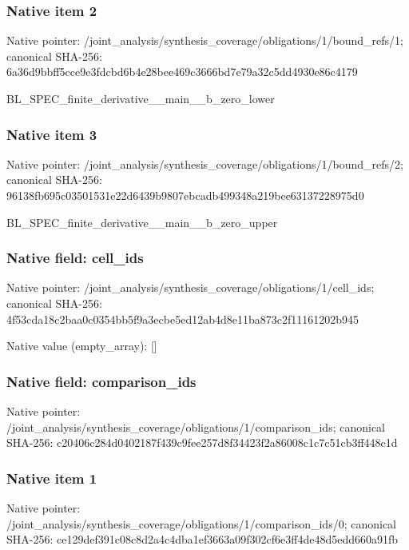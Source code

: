 \documentclass[10pt,a4paper]{article}
\begin{document}
\subsubsection{Native item 2}
Native pointer: /joint\_\allowbreak{}analysis/synthesis\_\allowbreak{}coverage/obligations/1/bound\_\allowbreak{}refs/1; canonical SHA-256: 6a36d9bbff5cce9e3fdcbd6b4e28bee469c3666bd7e79a32c5dd4930e86c4179

\begingroup\raggedright\sloppy BL\_\allowbreak{}SPEC\_\allowbreak{}finite\_\allowbreak{}derivative\_\allowbreak{}\_\allowbreak{}main\_\allowbreak{}\_\allowbreak{}b\_\allowbreak{}zero\_\allowbreak{}lower\par\endgroup

\subsubsection{Native item 3}
Native pointer: /joint\_\allowbreak{}analysis/synthesis\_\allowbreak{}coverage/obligations/1/bound\_\allowbreak{}refs/2; canonical SHA-256: 96138fb695c03501531e22d6439b9807ebcadb499348a219bee63137228975d0

\begingroup\raggedright\sloppy BL\_\allowbreak{}SPEC\_\allowbreak{}finite\_\allowbreak{}derivative\_\allowbreak{}\_\allowbreak{}main\_\allowbreak{}\_\allowbreak{}b\_\allowbreak{}zero\_\allowbreak{}upper\par\endgroup

\subsubsection{Native field: cell\_\allowbreak{}ids}
Native pointer: /joint\_\allowbreak{}analysis/synthesis\_\allowbreak{}coverage/obligations/1/cell\_\allowbreak{}ids; canonical SHA-256: 4f53cda18c2baa0c0354bb5f9a3ecbe5ed12ab4d8e11ba873c2f11161202b945

Native value (empty\_\allowbreak{}array): []

\subsubsection{Native field: comparison\_\allowbreak{}ids}
Native pointer: /joint\_\allowbreak{}analysis/synthesis\_\allowbreak{}coverage/obligations/1/comparison\_\allowbreak{}ids; canonical SHA-256: c20406c284d0402187f439c9fee257d8f34423f2a86008c1c7c51cb3ff448c1d

\subsubsection{Native item 1}
Native pointer: /joint\_\allowbreak{}analysis/synthesis\_\allowbreak{}coverage/obligations/1/comparison\_\allowbreak{}ids/0; canonical SHA-256: ce129def391c08c8d2a4c4dba1ef3663a09f302cf6e3ff4de48d5edd660a91fb
\end{document}
